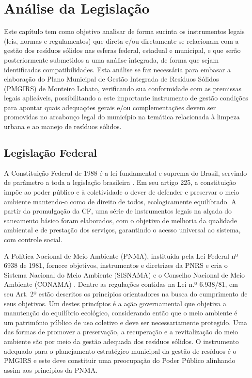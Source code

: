 	\section{Análise da Legislação}
	Este capítulo tem como objetivo analisar de forma sucinta os instrumentos legais (leis, normas e regulamentos) que direta e/ou diretamente se relacionam com a gestão dos resíduos sólidos nas esferas federal, estadual e municipal, e que serão posteriormente submetidos a uma análise integrada, de forma que sejam identificadas compatibilidades. Esta análise se faz necessária para embasar a elaboração do Plano Municipal de Gestão Integrada de Resíduos Sólidos (PMGIRS) de Monteiro Lobato, verificando sua conformidade com as premissas legais aplicáveis, possibilitando a este importante instrumento de gestão condições para apontar quais adequações gerais e/ou complementações devem ser promovidas no arcabouço legal do município na temática relacionada à limpeza urbana e ao manejo de resíduos sólidos.
	
	\subsection{Legislação Federal}
	A Constituição Federal de 1988 é a lei fundamental e suprema do Brasil, servindo de parâmetro a toda a legislação brasileira \cite{do1988constituiccao}. Em seu artigo 225, a constituição impõe ao poder público e à coletividade o dever de defender e preservar o meio ambiente mantendo-o como de direito de todos, ecologicamente equilibrado. A partir da promulgação da CF, uma série de instrumentos legais na alçada do saneamento básico foram elaborados, com o objetivo de melhoria da qualidade ambiental e de prestação dos serviços, garantindo o acesso universal ao sistema, com controle social.
	
	A Política Nacional de Meio Ambiente (PNMA), instituída pela Lei Federal nº 6938 de 1981, fornece objetivos, instrumentos e diretrizes da PNRS e cria o Sistema Nacional do Meio Ambiente (SISNAMA) e o Conselho Nacional de Meio Ambiente (CONAMA) \cite{machado2012principios}. Dentre as regulações contidas na Lei n.º 6.938/81, em seu Art. 2º estão descritos os princípios orientadores na busca do cumprimento de seus objetivos. Um destes princípios é a ação governamental que objetiva a manutenção do equilíbrio ecológico, considerando então que o meio ambiente é um patrimônio público de uso coletivo e deve ser necessariamente protegido. Uma das formas de promover a preservação, a recuperação e a revitalização do meio ambiente são por meio da gestão adequada dos resíduos sólidos. O instrumento adequado para o planejamento estratégico municipal da gestão de resíduos é o PMGIRS e este deve constituir uma preocupação do Poder Público alinhando assim aos princípios da PNMA.
	
